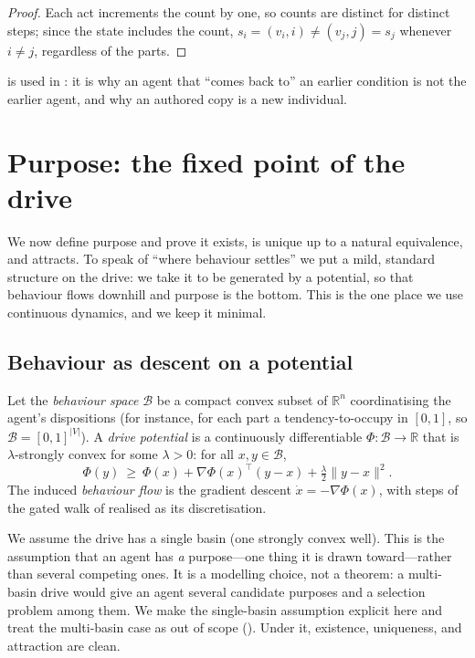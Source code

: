 \documentclass[11pt,twocolumn,a4paper]{article}
\newcommand{\R}{\mathbb{R}}
\newcommand{\V}{V}
\newcommand{\state}{s}
\newcommand{\Beh}{\mathcal{B}}       %
\newcommand{\abs}[1]{\lvert#1\rvert}
\newcommand{\norm}[1]{\lVert#1\rVert}
\begin{document}
\begin{proof}
Each act increments the count by one, so counts are distinct for distinct
steps; since the state includes the count, $\state_i=(v_i,i)\neq
(v_j,j)=\state_j$ whenever $i\neq j$, regardless of the parts.
\end{proof}

 is used in : it is why an
agent that ``comes back to'' an earlier condition is not the earlier
agent, and why an authored copy is a new individual.

\section{Purpose: the fixed point of the drive}
\label{sec:purpose}

We now define purpose and prove it exists, is unique up to a natural
equivalence, and attracts. To speak of ``where behaviour settles'' we put
a mild, standard structure on the drive: we take it to be generated by a
potential, so that behaviour flows downhill and purpose is the bottom.
This is the one place we use continuous dynamics, and we keep it minimal.

\subsection{Behaviour as descent on a potential}

\begin{definition}
\label{def:behspace}
Let the \emph{behaviour space} $\Beh$ be a compact convex subset of $\R^n$
coordinatising the agent's dispositions (for instance, for each part a
tendency-to-occupy in $[0,1]$, so $\Beh=[0,1]^{\abs\V}$). A \emph{drive
potential} is a continuously differentiable $\Phi:\Beh\to\R$ that is
$\lambda$-strongly convex for some $\lambda>0$: for all $x,y\in\Beh$,
\[
\Phi(y)\ \ge\ \Phi(x)+\nabla\Phi(x)^\top(y-x)+\tfrac{\lambda}{2}\norm{y-x}^2.
\]
The induced \emph{behaviour flow} is the gradient descent
$\dot x=-\nabla\Phi(x)$, with steps of the gated walk of
 realised as its discretisation.
\end{definition}

\begin{remark}
\label{rem:convex}
We assume the drive has a single basin (one strongly convex well). This
is the assumption that an agent has \emph{a} purpose---one thing it is
drawn toward---rather than several competing ones. It is a modelling
choice, not a theorem: a multi-basin drive would give an agent several
candidate purposes and a selection problem among them. We make the
single-basin assumption explicit here and treat the multi-basin case as
out of scope (). Under it, existence, uniqueness, and
attraction are clean.
\end{remark}
\end{document}
